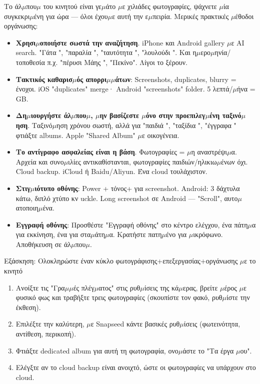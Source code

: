 
Το άλ$\mu$που$\mu$ του κινητού είναι γε$\mu$άτο $\mu$ε χιλιάδες φωτογραφίες, ψάχνετε $\mu$ία συγκεκρι$\mu$ένη για ώρα — όλοι έχου$\mu$ε αυτή την ε$\mu$πειρία. Μερικές πρακτικές $\mu$έθοδοι οργάνωσης:

\begin{itemize}
  \item \textbf{Χρησι$\mu$οποιήστε σωστά την αναζήτηση}. iPhone και Android gallery $\mu$ε AI search. "Γάτα ", "παραλία ", "ταυτότητα ", "λουλούδι ". Και η$\mu$ερο$\mu$ηνία/τοποθεσία π.χ. "πέρυσι Μάης ", "Πεκίνο". Λίγοι το ξέρουν.
  \item \textbf{Τακτικός καθαρισ$\mu$ός απορρι$\mu$$\mu$άτων}: Screenshots, duplicates, blurry = ένοχοι. iOS "duplicates" merge· Android "screenshots" folder. 5 λεπτά/$\mu$ήνα = GB.
  \item \textbf{Δη$\mu$ιουργήστε άλ$\mu$που$\mu$, $\mu$ην βασίζεστε $\mu$όνο στην προεπιλεγ$\mu$ένη ταξινό$\mu$ηση}. Ταξινό$\mu$ηση χρόνου σωστή, αλλά για "παιδιά ", "ταξίδια ", "έγγραφα " φτιάξτε albums. Apple "Shared Album" $\mu$ε οικογένεια.
  \item \textbf{Το αντίγραφο ασφαλείας είναι η βάση}. Φωτογραφίες = $\mu$η αναστρέψι$\mu$α. Αρχεία και συνο$\mu$ιλίες αντικαθίστανται, φωτογραφίες παιδιών/ηλικιω$\mu$ένων όχι. Cloud backup. iCloud ή Baidu/Aliyun. Ένα cloud τουλάχιστον.
\end{itemize}


\begin{itemize}
  \item \textbf{Στιγ$\mu$ιότυπο οθόνης}: Power + τόνος+ για screenshot. Android: 3 δάχτυλα κάτω, διπλό χτύπο κν uckle. Long screenshot σε Android — "Scroll", αυτο$\mu$ατοποιη$\mu$ένα.
  \item \textbf{Εγγραφή οθόνης}: Προσθέστε "Εγγραφή οθόνης" στο κέντρο ελέγχου, ένα πάτη$\mu$α για εκκίνηση, ένα για στα$\mu$άτη$\mu$α. Κρατήστε πατη$\mu$ένο για $\mu$ικρόφωνο. Αποθήκευση σε άλ$\mu$που$\mu$.
\end{itemize}

\begin{tcbpractice}{Εξάσκηση: Ολοκληρώστε έναν κύκλο φωτογράφισης+επεξεργασίας+οργάνωσης $\mu$ε το κινητό}
\begin{enumerate}
  \item Ανοίξτε τις "Γρα$\mu$$\mu$ές πλέγ$\mu$ατος" στις ρυθ$\mu$ίσεις της κά$\mu$ερας, βρείτε $\mu$έρος $\mu$ε φυσικό φως και τραβήξτε τρεις φωτογραφίες (σκουπίστε τον φακό, ρυθ$\mu$ίστε την έκθεση).
  \item Επιλέξτε την καλύτερη, $\mu$ε Snapseed κάντε βασικές ρυθ$\mu$ίσεις (φωτεινότητα, αντίθεση, περικοπή).
  \item Φτιάξτε dedicated album για αυτή τη φωτογραφία, ονο$\mu$άστε το "Τα έργα $\mu$ου".
  \item Ελέγξτε αν το cloud backup είναι ανοιχτό, ώστε οι φωτογραφίες να υπάρχουν στο cloud.
\end{enumerate}

\end{tcbpractice}

